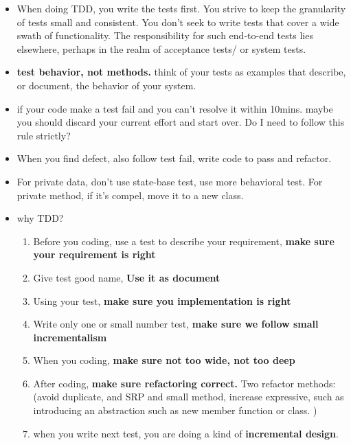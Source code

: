 \documentclass[a4paper,11pt,twoside]{book}
\begin{document}
\begin{itemize}
	\item When doing TDD, you write the tests first. You strive to keep the granularity of tests small and consistent. You don't seek to write tests that cover a wide swath of functionality. The responsibility for such end-to-end tests lies elsewhere, perhaps in the realm of acceptance tests/ or system tests. 
	
	\item \textbf{test behavior, not methods.} think of your tests as examples that describe, or document, the behavior of your system. 
		
	\item if your code make a test fail and you can't resolve it within 10mins. maybe you should discard your current effort and start over. Do I need to follow this rule strictly? 
		
	\item When you find defect, also follow test fail, write code to pass and refactor.
	
	\item For private data,  don't use state-base test, use more behavioral test. For private method, if it's compel, move it to a new class. 
		
	\item why TDD?
		\begin{enumerate}
			\item Before you coding, use a test to describe your requirement, \textbf{make sure your requirement is right}
			\item Give test good name, \textbf{Use it as document}
			\item Using your test, \textbf{make sure you implementation is right }
			\item Write only one or small number test, \textbf{make sure we follow small incrementalism}
			\item When you coding, \textbf{make sure not too wide, not too deep}
			\item After coding, \textbf{make sure refactoring correct.} Two refactor methods: (avoid duplicate, and SRP and small method, increase expressive, such as introducing an abstraction such as new member function or class. )
			\item when you write next test, you are doing a kind of \textbf{incremental design}.
		\end{enumerate}
	
\end{itemize}
\end{document}
